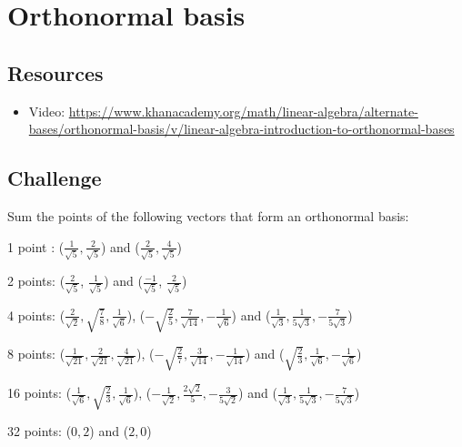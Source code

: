 
\timebox




\newpage
\section{Orthonormal basis}

\subsection*{Resources}
\begin{itemize}
    \item Video: \url{https://www.khanacademy.org/math/linear-algebra/alternate-bases/orthonormal-basis/v/linear-algebra-introduction-to-orthonormal-bases}
\end{itemize}

\subsection*{Challenge}
Sum the points of the following vectors that form an orthonormal basis:

1 point :
($\displaystyle \frac{1}{\sqrt{5}}, \frac{2}{\sqrt{5}}$) and
($\displaystyle \frac{2}{\sqrt{5}}, \frac{4}{\sqrt{5}}$)

2 points:
($\displaystyle \frac{2}{\sqrt{5}}$, $\displaystyle \frac{1}{\sqrt{5}}$) and
($\displaystyle \frac{-1}{\sqrt{5}}$, $\displaystyle \frac{2}{\sqrt{5}}$)

4 points:
($\displaystyle \frac{2}{\sqrt{2}}, \sqrt{\frac{7}{8}}, \frac{1}{\sqrt{6}}$),
($\displaystyle -\sqrt{\frac{2}{5}}, \frac{7}{\sqrt{14}}, -\frac{1}{\sqrt{6}}$) and
($\displaystyle \frac{1}{\sqrt{3}},  \frac{1}{5 \sqrt{3}}, -\frac{7}{5 \sqrt{3}}$)

8 points:
($\displaystyle \frac{1}{\sqrt{21}}, \frac{2}{\sqrt{21}}, \frac{4}{\sqrt{21}}$),
($\displaystyle -\sqrt{\frac{2}{7}}, \frac{3}{\sqrt{14}}, -\frac{1}{\sqrt{14}}$) and
($\displaystyle \sqrt{\frac{2}{3}},  \frac{1}{\sqrt{6}}, -\frac{1}{\sqrt{6}}$)

16 points:
($\displaystyle \frac{1}{\sqrt{6}}, \sqrt{\frac{2}{3}}, \frac{1}{\sqrt{6}}$),
($\displaystyle -\frac{1}{\sqrt{2}},  \frac{2 \sqrt{2}}{5}, -\frac{3}{5 \sqrt{2}}$) and
($\displaystyle \frac{1}{\sqrt{3}},  \frac{1}{5 \sqrt{3}}, -\frac{7}{5 \sqrt{3}}$)

32 points:
($0, 2$) and ($2, 0$)

